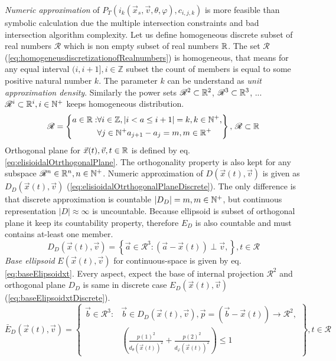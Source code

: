 \noindent \emph{Numeric approximation} of $P_T(i_k(\vec{x}_s,\vec{v},\theta,\varphi),c_{i,j,k})$ is more feasible than symbolic calculation due the multiple intersection constraints and bad intersection algorithm complexity. Let us define homogeneous discrete subset of real numbers $\mathscr{R}$ which is non empty subset of real numbers $\mathbb{R}$. The set $\mathscr{R}$ (\ref{eq:homogeneusdiscretizationofRealnumbers}) is homogeneous, that means for any equal interval $(i,i+1],i\in\mathbb{Z}$ subset the count of members is equal to some positive natural number $k$. The parameter $k$ can be understand as \emph{unit approximation density}.
Similarly the power sets $\mathscr{R}^2\subset\mathbb{R}^2$, $\mathscr{R}^3\subset\mathbb{R}^3$, ... $\mathscr{R}^i\subset\mathbb{R}^i,i\in\mathbb{N}^+$ keeps homogeneous distribution.
\begin{equation}\label{eq:homogeneusdiscretizationofRealnumbers}
    \mathscr{R} = \left\{\begin{aligned}a\in\mathbb{R}:&\forall i\in\mathbb{Z},|i<a\le i+1|=k,k\in\mathbb{N}^+, \\&\forall j\in \mathbb{N}^+a_{j+1}-a_{j}=m,m\in\mathbb{R}^+\end{aligned}\right\},\,\mathscr{R}\subset\mathbb{R}
\end{equation}
\noindent Orthogonal plane for $\vec{x}(t), \vec{v}, t \in\mathbb{R}$ is defined by eq. \ref{eq:elisioidalOtrthogonalPlane}. The orthogonality property is also kept for any subspace $\mathscr{R}^n\in\mathbb{R}^n,n\in\mathbb{N}^+$. Numeric approximation of $D(\vec{x}(t),\vec{v})$ is given as $D_D(\vec{x}(t),\vec{v})$ (\ref{eq:elisioidalOtrthogonalPlaneDiscrete}). The only difference is that discrete approximation is countable $|D_D|=m,m\in\mathbb{N}^+$, but continuous representation $|D|\approx \infty$ is uncountable. Because ellipsoid is subset of orthogonal plane it keep its countability property, therefore $E_D$ is also countable and must contains at-least one member.  
\begin{equation}\label{eq:elisioidalOtrthogonalPlaneDiscrete}
    D_D(\vec{x}(t),\vec{v})=\left\{\vec{a}\in\mathscr{R}^3:(\vec{a}-\vec{x}(t))\perp\vec{v},\right\},t\in\mathscr{R}
\end{equation}
\noindent\emph{Base ellipsoid} $E(\vec{x}(t),\vec{v})$ for continuous-space is given by eq. \ref{eq:baseElipsoidxt}. Every aspect, expect the base of internal projection $\mathscr{R}^2$ and orthogonal plane $D_D$ is same in discrete case $E_D(\vec{x}(t),\vec{v})$ (\ref{eq:baseElipsoidxtDiscrete}).
\begin{equation}\label{eq:baseElipsoidxtDiscrete}
    \bar{E}_D(\vec{x}(t),\vec{v})=\left\{ \begin{aligned}\vec{b}\in\mathscr{R}^3:&\vec{b}\in D_D(\vec{x}(t),\vec{v}),\vec{p}=(\vec{b}-\vec{x}(t))\to\mathscr{R}^2,\\&\left(\frac{p(1)^2} {d_\theta(\vec{x}(t))^2}+ \frac{p(2)^2}{d_\varphi(\vec{x}(t))^2}\right)\le 1\end{aligned}\right\},t\in\mathscr{R}
\end{equation}

